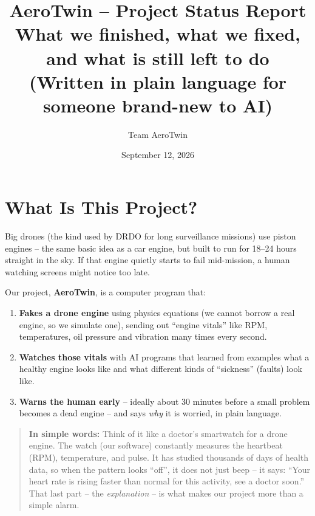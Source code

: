 \documentclass[11pt]{article}
\title{\textbf{AeroTwin -- Project Status Report}\\[4pt]
\large What we finished, what we fixed, and what is still left to do\\[2pt]
\normalsize (Written in plain language for someone brand-new to AI)}
\author{Team AeroTwin}
\date{September 12, 2026}
\newenvironment{simplebox}
  {\par\medskip\noindent\begin{quote}\color{blue!55!black}\small
   \textbf{\textsf{In simple words:}}\space\space}
  {\end{quote}\medskip}
\begin{document}
\maketitle
\tableofcontents
\newpage

\section{What Is This Project?}

Big drones (the kind used by DRDO for long surveillance missions) use piston
engines -- the same basic idea as a car engine, but built to run for 18--24
hours straight in the sky. If that engine quietly starts to fail mid-mission,
a human watching screens might notice too late.

Our project, \textbf{AeroTwin}, is a computer program that:

\begin{enumerate}[nosep]
  \item \textbf{Fakes a drone engine} using physics equations (we cannot
        borrow a real engine, so we simulate one), sending out ``engine
        vitals'' like RPM, temperatures, oil pressure and vibration many
        times every second.
  \item \textbf{Watches those vitals} with AI programs that learned from
        examples what a healthy engine looks like and what different kinds
        of ``sickness'' (faults) look like.
  \item \textbf{Warns the human early} -- ideally about 30 minutes before a
        small problem becomes a dead engine -- and says \emph{why} it is
        worried, in plain language.
\end{enumerate}

\begin{simplebox}
Think of it like a doctor's smartwatch for a drone engine. The watch (our
software) constantly measures the heartbeat (RPM), temperature, and pulse.
It has studied thousands of days of health data, so when the pattern looks
``off'', it does not just beep -- it says: ``Your heart rate is rising
faster than normal for this activity, see a doctor soon.'' That last part
-- the \emph{explanation} -- is what makes our project more than a simple
alarm.
\end{simplebox}
\end{document}
